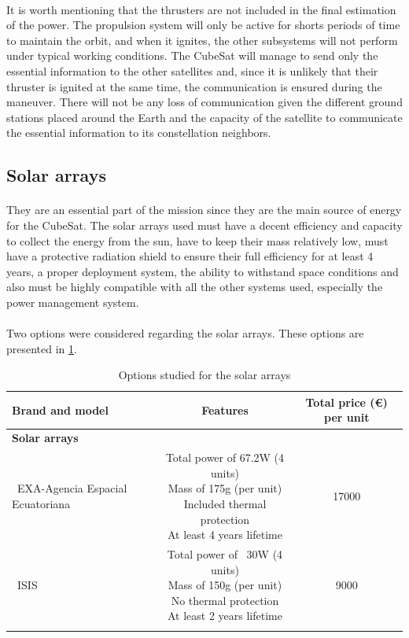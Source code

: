\paragraph{}It is worth mentioning that the thrusters are not included in the final estimation of the power. The propulsion system will only be active for shorts periods of time to maintain the orbit, and when it ignites, the other subsystems will not perform under typical working conditions. The CubeSat will manage to send only the essential information to the other satellites and, since it is unlikely that their thruster is ignited at the same time, the communication is ensured during the maneuver. There will not be any loss of communication given the different ground stations placed around the Earth and the capacity of the satellite to communicate the essential information to its constellation neighbors.

\subsection{Solar arrays}
\paragraph{}They are an essential part of the mission since they are the main source of energy for the CubeSat. The solar arrays used must have a decent efficiency and capacity to collect the energy from the sun, have to keep their mass relatively low, must have a protective radiation shield to ensure their full efficiency for at least 4 years, a proper deployment system, the ability to withstand space conditions and also must be highly compatible with all the other systems used, especially the power management system.

\paragraph{}Two options were considered regarding the solar arrays. These options are presented in \ref{solararraysoptions}.

\begin{longtable}{| l | c | c | }
\hline
\rowcolor[gray]{0.80}	\textbf{Brand and model} &  \textbf{Features}     & \textbf{Total price (\euro) per unit}   \\
\hline
\endfirsthead

\rowcolor[gray]{0.85} \textbf{Solar arrays} &  &  \\
	   ~EXA-Agencia Espacial Ecuatoriana & \makecell{Total power of 67.2W (4 units)\\ Mass of 175g (per unit) \\ Included thermal protection \\At least 4 years lifetime} & 17000 \\
	   \hline
	   ~ISIS & \makecell{Total power of ~30W (4 units) \\ Mass of 150g (per unit) \\ No thermal protection \\At least 2 years lifetime} & 9000 \\
	   \hline
\caption{Options studied for the solar arrays}
\label{solararraysoptions}
\end{longtable}

